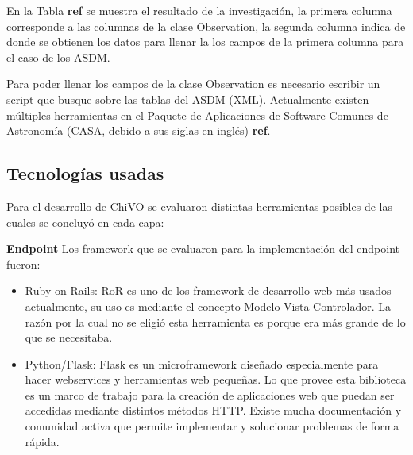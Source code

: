 En la Tabla \textbf{ref} se muestra el resultado de la investigación, la primera columna corresponde a las columnas de la clase Observation, la segunda columna indica de donde se obtienen los datos para llenar la los campos de la primera columna para el caso de los ASDM.

Para poder llenar los campos de la clase Observation es necesario escribir un script que busque sobre las tablas del ASDM (XML). Actualmente existen múltiples herramientas en el Paquete de Aplicaciones de Software Comunes de Astronomía (CASA, debido a sus siglas en inglés) \textbf{ref}.

\subsection{Tecnologías usadas}
Para el desarrollo de ChiVO se evaluaron distintas herramientas posibles de las cuales se concluyó en cada capa:

\textbf{Endpoint}
Los framework que se evaluaron para la implementación del endpoint fueron:
\begin{itemize}
    \item Ruby on Rails: RoR es uno de los framework de desarrollo web más usados actualmente, su uso es mediante el concepto Modelo-Vista-Controlador. La razón por la cual no se eligió esta herramienta es porque era más grande de lo que se necesitaba.
    \item Python/Flask: Flask es un microframework diseñado especialmente para hacer webservices y herramientas web pequeñas. Lo que provee esta biblioteca es un marco de trabajo para la creación de aplicaciones web que puedan ser accedidas mediante distintos métodos HTTP. Existe mucha documentación y comunidad activa que permite implementar y solucionar problemas de forma rápida.
\end{itemize}

